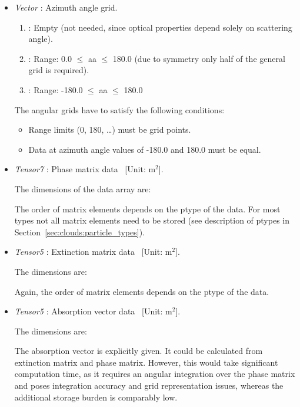 \begin{itemize}
\item {\sl Vector} : Azimuth angle grid.
  \begin{enumerate}
  \item {}:
    Empty (not needed, since optical properties depend solely on scattering
    angle).
  \item {}:
    Range: 0.0\degree{} $\le$ aa $\le$ 180.0\degree{} (due to symmetry only half of
    the general grid is required).
  \item {}: Range: -180.0\degree{} $\le$ aa $\le$ 180.0\degree{}
  \end{enumerate}
  
  The angular grids have to satisfy the following conditions:
  \begin{itemize}
  \item Range limits (0\degree{}, 180\degree{}, \dots) must be grid points.
  \item Data at azimuth angle values of -180.0\degree{} and 180.0\degree{} must be equal.
  \end{itemize}
  
\item {\sl Tensor7} :
  Phase matrix data \EnsAvr\PhaMat\ [Unit: m$^2$].

  The dimensions of the data array are:  
  
  
  The order of matrix elements depends on the ptype of the data. For most types
  not all matrix elements need to be stored (see description of ptypes in
  Section~\ref{sec:clouds:particle_types}).

\item {\sl Tensor5} :
  Extinction matrix data \EnsAvr\ExtMat\ [Unit: m$^2$].

  The dimensions are: 

  
  Again, the order of matrix elements depends on the ptype of the data.

\item {\sl Tensor5} :
  Absorption vector data \EnsAvr\AbsVec\ [Unit: m$^2$]. 
  
  The dimensions are: 
  

  The absorption vector is explicitly given. It could be calculated
  from extinction matrix and phase matrix. However, this would take
  significant computation time, as it requires an angular integration over
  the phase matrix and poses integration accuracy and grid representation
  issues, whereas the additional storage burden is comparably low.
\end{itemize}

